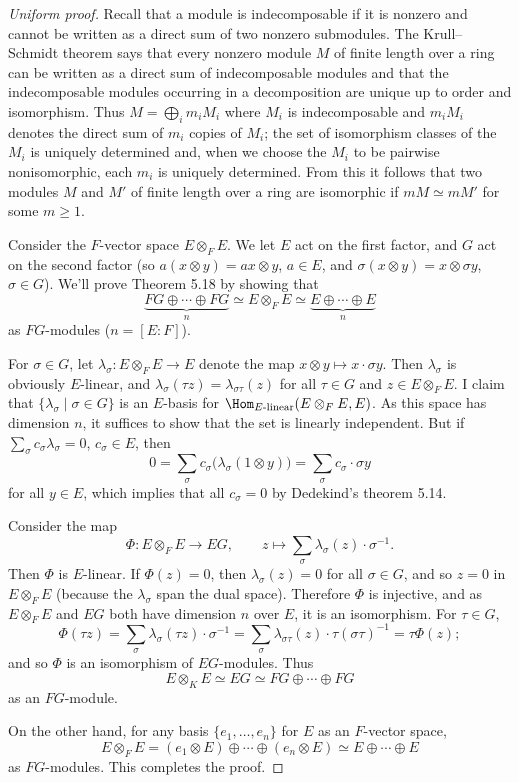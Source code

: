 \begin{proof}[Uniform proof]
Recall that a module is indecomposable if it is nonzero and cannot be written as a direct sum of two nonzero submodules. The Krull--Schmidt theorem says that every nonzero module $M$ of finite length over a ring can be written as a direct sum of indecomposable modules and that the indecomposable modules occurring in a decomposition are unique up to order and isomorphism. Thus $M=\bigoplus_i m_iM_i$ where $M_i$ is indecomposable and $m_iM_i$ denotes the direct sum of $m_i$ copies of $M_i$; the set of isomorphism classes of the $M_i$ is uniquely determined and, when we choose the $M_i$ to be pairwise nonisomorphic, each $m_i$ is uniquely determined. From this it follows that two modules $M$ and $M'$ of finite length over a ring are isomorphic if $mM\simeq mM'$ for some $m\geq1$.

Consider the $F$-vector space $E\otimes_F E$. We let $E$ act on the first factor, and $G$ act on the second factor (so $a(x\otimes y)=ax\otimes y$, $a\in E$, and $\sigma(x\otimes y)=x\otimes\sigma y$, $\sigma\in G$). We'll prove Theorem 5.18 by showing that
\[
\underbrace{FG\oplus\cdots\oplus FG}_{n}\simeq E\otimes_F E
\simeq\underbrace{E\oplus\cdots\oplus E}_{n}
\]
as $FG$-modules ($n=[E:F]$).

For $\sigma\in G$, let $\lambda_\sigma:E\otimes_F E\to E$ denote the map $x\otimes y\mapsto x\cdot\sigma y$. Then $\lambda_\sigma$ is obviously $E$-linear, and $\lambda_\sigma(\tau z)=\lambda_{\sigma\tau}(z)$ for all $\tau\in G$ and $z\in E\otimes_F E$. I claim that $\{\lambda_\sigma\mid\sigma\in G\}$ is an $E$-basis for $\Hom_{E\text{-linear}}(E\otimes_F E,E)$. As this space has dimension $n$, it suffices to show that the set is linearly independent. But if $\sum_\sigma c_\sigma\lambda_\sigma=0$, $c_\sigma\in E$, then
\[
0=\sum_\sigma c_\sigma\bigl(\lambda_\sigma(1\otimes y)\bigr)
=\sum_\sigma c_\sigma\cdot\sigma y
\]
for all $y\in E$, which implies that all $c_\sigma=0$ by Dedekind's theorem 5.14.

Consider the map
\[
\Phi:E\otimes_F E\longrightarrow EG,\qquad
z\longmapsto\sum_\sigma\lambda_\sigma(z)\cdot\sigma^{-1}.
\]
Then $\Phi$ is $E$-linear. If $\Phi(z)=0$, then $\lambda_\sigma(z)=0$ for all $\sigma\in G$, and so $z=0$ in $E\otimes_F E$ (because the $\lambda_\sigma$ span the dual space). Therefore $\Phi$ is injective, and as $E\otimes_F E$ and $EG$ both have dimension $n$ over $E$, it is an isomorphism. For $\tau\in G$,
\[
\Phi(\tau z)=\sum_\sigma\lambda_\sigma(\tau z)\cdot\sigma^{-1}
=\sum_\sigma\lambda_{\sigma\tau}(z)\cdot\tau(\sigma\tau)^{-1}
=\tau\Phi(z);
\]
and so $\Phi$ is an isomorphism of $EG$-modules. Thus
\[
E\otimes_K E\simeq EG\simeq FG\oplus\cdots\oplus FG
\]
as an $FG$-module.

On the other hand, for any basis $\{e_1,\ldots,e_n\}$ for $E$ as an $F$-vector space,
\[
E\otimes_F E=(e_1\otimes E)\oplus\cdots\oplus(e_n\otimes E)
\simeq E\oplus\cdots\oplus E
\]
as $FG$-modules. This completes the proof.
\end{proof}

